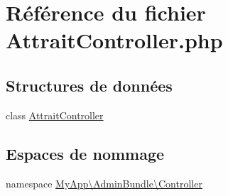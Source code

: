 \hypertarget{_attrait_controller_8php}{\section{Référence du fichier Attrait\-Controller.\-php}
\label{_attrait_controller_8php}
}
\subsection*{Structures de données}
\begin{DoxyCompactItemize}
\item 
class \hyperlink{class_my_app_1_1_admin_bundle_1_1_controller_1_1_attrait_controller}{Attrait\-Controller}
\end{DoxyCompactItemize}
\subsection*{Espaces de nommage}
\begin{DoxyCompactItemize}
\item 
namespace \hyperlink{namespace_my_app_1_1_admin_bundle_1_1_controller}{My\-App\textbackslash{}\-Admin\-Bundle\textbackslash{}\-Controller}
\end{DoxyCompactItemize}
